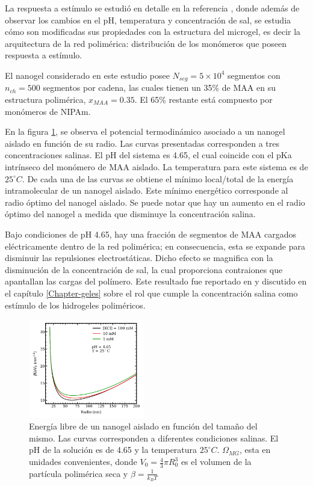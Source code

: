 	La respuesta a est\'imulo se estudi\'o en detalle en la referencia \cite{perez2021thermodynamic}, donde adem\'as de observar los cambios en el pH, temperatura y concentraci\'on de sal, se estudia c\'omo son modificadas sus propiedades con la estructura del microgel, es decir la arquitectura de la red polim\'erica: distribuci\'on de los mon\'omeros que poseen respuesta a est\'imulo.
	
	El nanogel considerado en este estudio posee $N_{seg} = 5 \times 10^4$ segmentos con $n_{ch} = 500$ segmentos por cadena, las cuales tienen un 35\% de MAA en su estructura polim\'erica, $x_{MAA} = 0.35$. El 65\% restante est\'a compuesto por mon\'omeros de NIPAm.
	
	En la figura \ref{fig:mc:energy-intra}, se observa el potencial termodin\'amico asociado a un nanogel aislado en funci\'on de su radio. Las curvas presentadas corresponden a tres concentraciones salinas. El pH del sistema es 4.65, el cual coincide con el pKa intr\'inseco del mon\'omero de MAA aislado. La temperatura para este sistema es de $25 ^\circ C$. De cada una de las curvas se obtiene el m\'inimo local/total de la energ\'ia intramolecular de un nanogel aislado. Este m\'inimo energ\'etico corresponde al radio \'optimo del nanogel aislado. Se puede notar que hay un aumento en el radio \'optimo del nanogel a medida que disminuye la concentraci\'on salina.
	
	Bajo condiciones de pH 4.65, hay una fracci\'on de segmentos de MAA cargados el\'ectricamente dentro de la red polim\'erica; en consecuencia, esta se expande para disminuir las repulsiones electrost\'aticas. Dicho efecto se magnifica con la disminuci\'on de la concentraci\'on de sal, la cual proporciona contraiones que apantallan las cargas del pol\'imero. Este resultado fue reportado en \cite{perez2021thermodynamic} y discutido en el cap\'itulo \ref{Chapter-geles} sobre el rol que cumple la concentraci\'on salina como est\'imulo de los hidrogeles polim\'ericos.
	
	
	\begin{figure}[!htb]
		\centering
		\includegraphics[width=0.45\textwidth]{Figures/graph-mc/interna.png}
		\caption{Energ\'ia libre de un nanogel aislado en funci\'on del tama\~no del mismo. Las curvas corresponden a diferentes condiciones salinas. El pH de la soluci\'on es de 4.65 y la temperatura $25 ^\circ C$. $\Omega_{MG}$, esta en unidades convenientes, donde $V_0=\frac{4}{3}\pi R_0^3$ es el volumen de la part\'icula polim\'erica seca y $\beta = \frac{1}{k_B T}$}
		\label{fig:mc:energy-intra}
	\end{figure}
	
